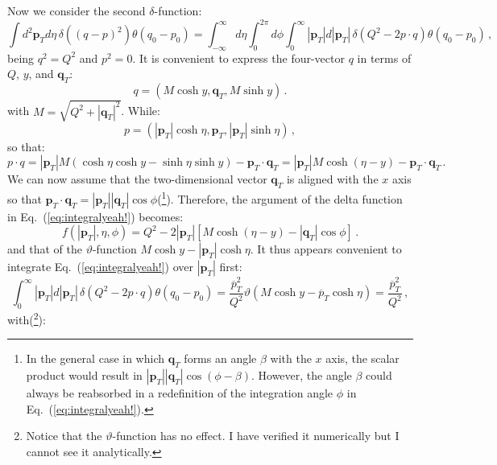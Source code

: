 \documentclass[10pt,a4paper]{article}
\begin{document}
Now we consider the second $\delta$-function:
\begin{equation}\label{eq:integralyeah!}
\int d^2\mathbf{p}_T d\eta\,\delta((q-p)^2)\theta(q_0-p_0)=\int_{-\infty}^\infty d\eta
\int_0^{2\pi} d\phi \int_0^\infty|\mathbf{p}_T|d|\mathbf{p}_T|\,\delta(Q^2-2p\cdot q) \theta(q_0-p_0)\,,
\end{equation}
being $q^2=Q^2$ and $p^2=0$. It is convenient to express the
four-vector $q$ in terms of $Q$, $y$, and $\mathbf{q}_T$:
\begin{equation}
q=\left(M\cosh y,\mathbf{q}_T,M\sinh y\right)\,.
\end{equation}
with $M=\sqrt{Q^2+|\mathbf{q}_T|^2}$. While:
\begin{equation}
p=\left(|\mathbf{p}_T|\cosh\eta,\mathbf{p}_T,|\mathbf{p}_T|\sinh\eta\right)\,,
\end{equation}
so that:
\begin{equation}
p\cdot q=|\mathbf{p}_T|M\left(\cosh\eta \cosh y-\sinh\eta\sinh
  y\right)-\mathbf{p}_T\cdot
\mathbf{q}_T=|\mathbf{p}_T|M\cosh\left(\eta - y\right)-\mathbf{p}_T\cdot \mathbf{q}_T\,.
\end{equation}
We can now assume that the two-dimensional vector $\mathbf{q}_T$ is
aligned with the $x$ axis so that
$\mathbf{p}_T\cdot \mathbf{q}_T =
|\mathbf{p}_T||\mathbf{q}_T|\cos\phi$(\footnote{In
  the general case in which $\mathbf{q}_T$ forms an angle $\beta$ with
  the $x$ axis, the scalar product would result in
  $|\mathbf{p}_T||\mathbf{q}_T|\cos(\phi-\beta)$. However, the angle
  $\beta$ could always be reabsorbed in a redefinition of the
  integration angle $\phi$ in
  Eq.~(\ref{eq:integralyeah!}).}). Therefore, the argument of the
delta function in Eq.~(\ref{eq:integralyeah!}) becomes:
\begin{equation}
f(|\mathbf{p}_T|,\eta,\phi) = Q^2-2 |\mathbf{p}_T|\left[M\cosh\left(\eta - y\right)-|\mathbf{q}_T|\cos\phi\right]\,.
\end{equation}
and that of the $\vartheta$-function
$M\cosh y-|\mathbf{p}_T|\cosh\eta$. It thus appears convenient to
integrate Eq.~(\ref{eq:integralyeah!}) over $|\mathbf{p}_T|$ first:
\begin{equation}\label{eq:firstintegral}
\int_0^\infty|\mathbf{p}_T|d|\mathbf{p}_T|\,\delta(Q^2-2p\cdot q) \theta(q_0-p_0)=\frac{\overline{p}_T^2}{Q^2}\vartheta(M\cosh y-\overline{p}_T\cosh\eta)=\frac{\overline{p}_T^2}{Q^2}\,,
\end{equation}
with(\footnote{Notice that the $\vartheta$-function has no effect. I
  have verified it numerically but I cannot see it analytically.}):
\end{document}
